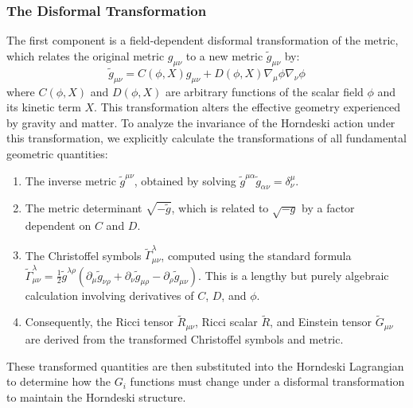\documentclass[twocolumn]{aastex631}
\begin{document}
\subsubsection{The Disformal Transformation}
The first component is a field-dependent disformal transformation of the metric, which relates the original metric $g_{\mu\nu}$ to a new metric $\tilde{g}_{\mu\nu}$ by:
$$
\tilde{g}_{\mu\nu} = C(\phi, X) g_{\mu\nu} + D(\phi, X) \nabla_\mu\phi \nabla_\nu\phi
$$
where $C(\phi, X)$ and $D(\phi, X)$ are arbitrary functions of the scalar field $\phi$ and its kinetic term $X$. This transformation alters the effective geometry experienced by gravity and matter. To analyze the invariance of the Horndeski action under this transformation, we explicitly calculate the transformations of all fundamental geometric quantities:
\begin{enumerate}
    \item The inverse metric $\tilde{g}^{\mu\nu}$, obtained by solving $\tilde{g}^{\mu\alpha} \tilde{g}_{\alpha\nu} = \delta^\mu_\nu$.
    \item The metric determinant $\sqrt{-\tilde{g}}$, which is related to $\sqrt{-g}$ by a factor dependent on $C$ and $D$.
    \item The Christoffel symbols $\tilde{\Gamma}^\lambda_{\mu\nu}$, computed using the standard formula $\tilde{\Gamma}^\lambda_{\mu\nu} = \frac{1}{2}\tilde{g}^{\lambda\rho}(\partial_\mu \tilde{g}_{\nu\rho} + \partial_\nu \tilde{g}_{\mu\rho} - \partial_\rho \tilde{g}_{\mu\nu})$. This is a lengthy but purely algebraic calculation involving derivatives of $C$, $D$, and $\phi$.
    \item Consequently, the Ricci tensor $\tilde{R}_{\mu\nu}$, Ricci scalar $\tilde{R}$, and Einstein tensor $\tilde{G}_{\mu\nu}$ are derived from the transformed Christoffel symbols and metric.
\end{enumerate}
These transformed quantities are then substituted into the Horndeski Lagrangian to determine how the $G_i$ functions must change under a disformal transformation to maintain the Horndeski structure.
\end{document}
